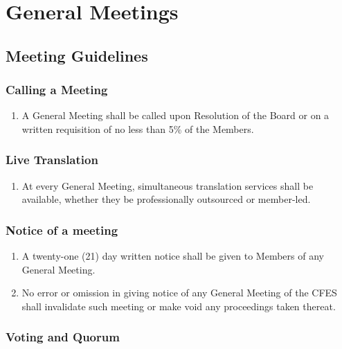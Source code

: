 \section{General Meetings}
\label{general-meetings}

\subsection{Meeting Guidelines}
\label{general-meetings-meeting-guidelines}

\subsubsection{Calling a Meeting}
\label{meeting-guidelines-calling-a-meeting}

\begin{enumerate}
 \item A General Meeting shall be called upon Resolution of the Board or on a written requisition of no less than 5\% of the Members.
\end{enumerate}

\subsubsection{Live Translation}
\label{meeting-guidelines-live-translation}

\begin{enumerate}
 \item At every General Meeting, simultaneous translation services shall be available, whether they be professionally outsourced or member-led.
\end{enumerate}

\subsubsection{Notice of a meeting}
\label{meeting-guidelines-notice-of-a-meeting}

\begin{enumerate}
 \item A twenty-one (21) day written notice shall be given to Members of any General Meeting.
 \item No error or omission in giving notice of any General Meeting of the CFES shall invalidate such meeting or make void any proceedings taken thereat.
\end{enumerate}

\subsubsection{Voting and Quorum}
\label{meeting-guidelines-voting-and-quorum}

